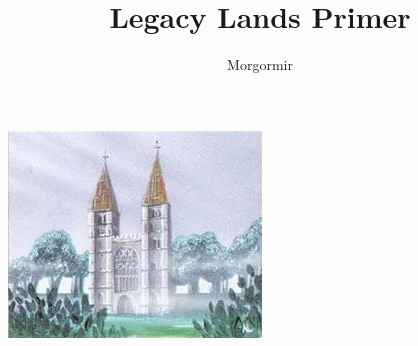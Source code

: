 \documentclass{report}
\begin{document}
\title{Legacy Lands Primer}
\author{Morgormir}
\maketitle
\includegraphics[width=\textwidth]{Tabernacle}
\tableofcontents{}
\end{document}
